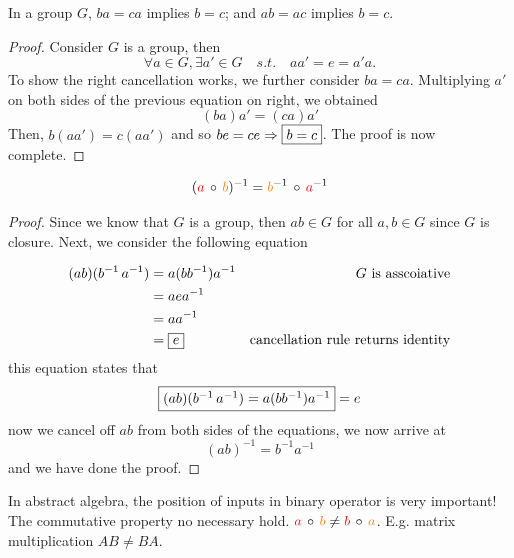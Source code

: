 \begin{lemma}
    In a group $G$, $ba = ca$ implies $b = c$; and $ab = ac$ implies $b=c$.
\end{lemma}
\begin{proof}
    Consider $G$ is a group, then 
    \[
        \forall a \in G, \exists a' \in G \quad s.t. \quad aa' = e = a'a.
    \]
    To show the right cancellation works, we further consider $ba=ca$. Multiplying $a'$ on both sides of the previous equation on right, 
    we obtained 
    \[
     (ba)a' = (ca)a'
    \]
    Then, $b(aa') = c(aa')$ and so $be = ce \Rightarrow \fbox{$b = c$}$. The proof is now complete.
\end{proof}

\begin{theorem}
    \begin{equation}
        ({\color{red} a}\, \circ \, {\color{orange} b })^{-1} = {\color{orange} b }^{-1} \, \circ \, {\color{red} a}^{-1}
    \end{equation}
\end{theorem}
\begin{proof}
    Since we know that $G$ is a group, then $ab \in G$ for all $a, b \in G$ since $G$ is closure.
    Next, we consider the following equation 

    \begin{align*}
        (ab)(b^{-1}\, a^{-1}) &= a(bb^{-1})a^{-1} & G \text{ is asscoiative}\\
        &= aea^{-1}\\
        &= aa^{-1}\\
        &= \fbox{$e$} & \text{cancellation rule returns identity}
    \end{align*}
    this equation states that
    \[
        \fbox{$(ab)(b^{-1}\, a^{-1}) = a(bb^{-1})a^{-1}$} = e
    \]
    now we cancel off $ab$ from both sides of the equations, we now arrive at 
    \[
        (ab)^{-1} = b^{-1} a^{-1}
    \]
    and we have done the proof.
\end{proof}

\begin{remark}
    In abstract algebra, the position of inputs in binary operator is very important! The commutative property no necessary hold.
    ${\color{red} a}\, \circ \, {\color{orange} b } \neq {\color{red} b}\, \circ \, {\color{orange} a }$.
    E.g. matrix multiplication $AB \neq BA$.
\end{remark}

